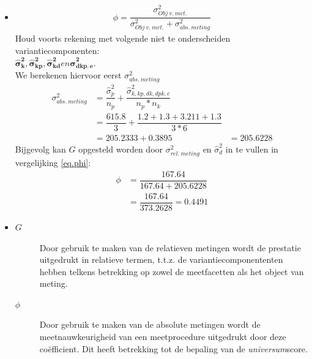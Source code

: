 {\begin{enumerate}
\begin{itemize}
	\item
	\begin{align}
		\phi =\dfrac{\sigma^2_{Obj~v.~met.}}{\sigma^2_{Obj~v.~met.}+ \sigma^2_{abs.~meting}} \label{eq.phi}
	\end{align}
	Houd voorts rekening met volgende niet te onderscheiden variantiecomponenten:~ \\
	$\bm{\hat{\sigma}^2_k},\bm{\hat{\sigma}^2_{kp}} , \bm{\hat{\sigma}^2_{kd}} en \bm{\hat{\sigma}^2_{dkp, e}}$.\\
	We berekenen hiervoor eerst $\sigma^2_{abs.~meting}$
	\begin{align*}
		\sigma^2_{abs.~meting} 	&=  \dfrac{\hat{\sigma}^2_{p}}{n_p} + \dfrac{\hat{\sigma}^2_{k, kp, dk, dpk, e}}{n_p*n_k} \\
								&=  \dfrac{{615.8}}{3} + \dfrac{{1.2 + 1.3 +  3.211 +1.3}}{3*6}\\
								&= 205.2333 + 0.3895 &= 205.6228
	\end{align*}
	Bijgevolg kan $G$ opgesteld worden door $\sigma^2_{rel.~meting}$ en $\hat{\sigma}^2_{d}$ in te vullen in vergelijking \ref{eq.phi}:
	\begin{align*}
		\phi 	&=\dfrac{167.64}{167.64+ 205.6228}\\
				&=\dfrac{167.64}{373.2628}=0.4491
	\end{align*}
	\item \begin{description}
		\item[$G$] Door gebruik te maken van de relatieven metingen wordt de prestatie uitgedrukt in relatieve termen, t.t.z. de variantiecomponententen hebben telkens betrekking op zowel de meetfacetten als het object van meting. 
		\item[$\phi$] Door gebruik te maken van de absolute metingen wordt de meetnauwkeurigheid van een meetprocedure uitgedrukt door deze co\"efficient.
		Dit heeft betrekking tot de bepaling van de \emph{universum}score.
	\end{description}
\end{itemize}
\end{enumerate}
}
